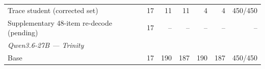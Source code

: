 \begin{table}[t]
{\begin{tabular}{lrrrrrr}
Trace student (corrected set) & 17 & 11 & 11 & 4 & 4 & 450/450 \\
Supplementary 48-item re-decode (pending) & 17 & -- & -- & -- & -- & -- \\
\midrule
\multicolumn{7}{l}{\textit{Qwen3.6-27B --- Trinity}} \\
Base & 17 & 190 & 187 & 190 & 187 & 450/450 \\

\end{tabular}}
\end{table}
